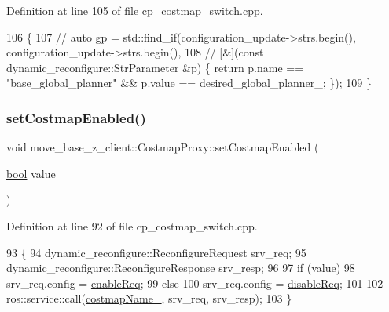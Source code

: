 Definition at line 105 of file cp\+\_\+costmap\+\_\+switch.\+cpp.


\begin{DoxyCode}
106 \{
107     \textcolor{comment}{// auto gp = std::find\_if(configuration\_update->strs.begin(), configuration\_update->strs.begin(),}
108     \textcolor{comment}{//                        [&](const dynamic\_reconfigure::StrParameter &p) \{ return p.name ==
       "base\_global\_planner" && p.value == desired\_global\_planner\_; \});}
109 \}
\end{DoxyCode}
\mbox{\label{classmove__base__z__client_1_1CostmapProxy_a7629d044447e215b5cdb1d15dedcbb35}} 
\subsubsection{\texorpdfstring{set\+Costmap\+Enabled()}{setCostmapEnabled()}}
{\footnotesize\ttfamily void move\+\_\+base\+\_\+z\+\_\+client\+::\+Costmap\+Proxy\+::set\+Costmap\+Enabled (\begin{DoxyParamCaption}\item[{\hyperlink{classbool}{bool}}]{value }\end{DoxyParamCaption})}



Definition at line 92 of file cp\+\_\+costmap\+\_\+switch.\+cpp.


\begin{DoxyCode}
93 \{
94     dynamic\_reconfigure::ReconfigureRequest srv\_req;
95     dynamic\_reconfigure::ReconfigureResponse srv\_resp;
96 
97     \textcolor{keywordflow}{if} (value)
98         srv\_req.config = \hyperlink{classmove__base__z__client_1_1CostmapProxy_a8839c249af6a53a7dc8f2672966cbbae}{enableReq};
99     \textcolor{keywordflow}{else}
100         srv\_req.config = \hyperlink{classmove__base__z__client_1_1CostmapProxy_a3b7933e704ce9bab4061d6902d0e961a}{disableReq};
101 
102     ros::service::call(\hyperlink{classmove__base__z__client_1_1CostmapProxy_a842fd8c5d276df96e20be8fdbda5c4aa}{costmapName\_}, srv\_req, srv\_resp);
103 \}
\end{DoxyCode}


